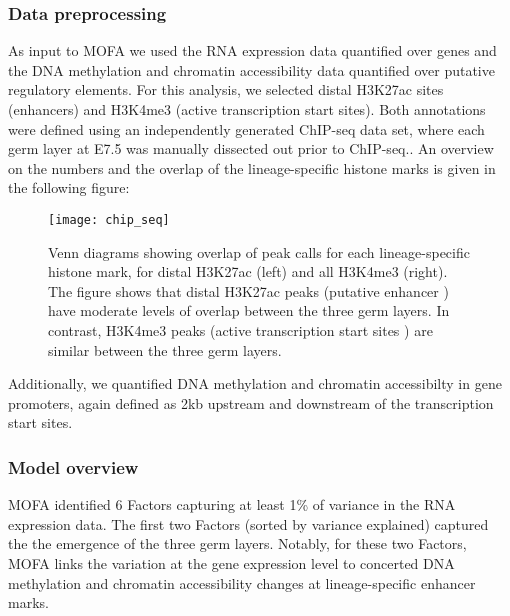 \subsubsection{Data preprocessing}

As input to MOFA we used the RNA expression data quantified over genes and the DNA methylation and chromatin accessibility data quantified over putative regulatory elements. For this analysis, we selected distal H3K27ac sites (enhancers) and H3K4me3 (active transcription start sites). Both annotations were defined using an independently generated ChIP-seq data set, where each germ layer at E7.5 was manually dissected out prior to ChIP-seq.\cite{Xiang2020}. An overview on the numbers and the overlap of the lineage-specific histone marks is given in the following figure:

\begin{figure}[H]
	\texttt{[image: chip\_seq]}
	\caption{
	Venn diagrams showing overlap of peak calls for each lineage-specific histone mark, for distal H3K27ac (left) and all H3K4me3 (right). The figure shows that distal H3K27ac peaks (putative enhancer \autocite{Creyghton2010}) have moderate levels of overlap between the three germ layers. In contrast, H3K4me3 peaks (active transcription start sites \autocite{Liang2004}) are similar between the three germ layers.
	}
	\label{fig:chip_seq}
\end{figure}

Additionally, we quantified DNA methylation and chromatin accessibilty in gene promoters, again defined as 2kb upstream and downstream of the transcription start sites.\\



\subsubsection{Model overview}

MOFA identified 6 Factors capturing at least 1\% of variance in the RNA expression data. The first two Factors (sorted by variance explained) captured the the emergence of the three germ layers. Notably, for these two Factors, MOFA links the variation at the gene expression level to concerted DNA methylation and chromatin accessibility changes at lineage-specific enhancer marks. 

